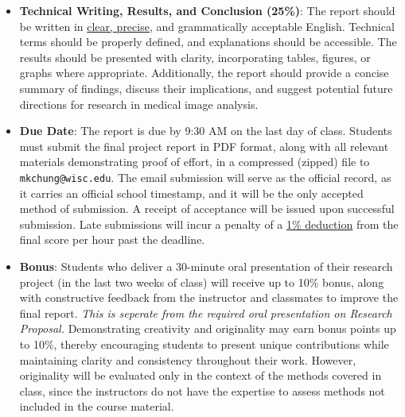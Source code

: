 \documentclass[12pt,portrait]{article}
\begin{document}
\begin{itemize}
{\it Example.} If you are implementing a diffusion-based learning method that was not covered in class, you must connect it to the diffusion equation discussed in class and clearly establish the detailed relationship between your approach and the covered diffusion equations. Failure to make this connection explicit will result in a loss of credit.




\item \textbf{Technical Writing, Results, and Conclusion (25\%)}: The report should be written in \underline{clear, precise}, and grammatically acceptable English. Technical terms should be properly defined, and explanations should be accessible. The results should be presented with clarity, incorporating tables, figures, or graphs where appropriate. Additionally, the report should provide a concise summary of findings, discuss their implications, and suggest potential future directions for research in medical image analysis.
    


\item \textbf{Due Date}: The report is due by 9:30 AM on the last day of class. Students must submit the final project report in PDF format, along with all relevant materials demonstrating proof of effort, in a compressed (zipped) file to {\tt mkchung@wisc.edu}. The email submission will serve as the official record, as it carries an official school timestamp, and it will be the only accepted method of submission. A receipt of acceptance will be issued upon successful submission. Late submissions will incur a penalty of a \underline{1\% deduction} from the final score per hour past the deadline.

\item \textbf{Bonus}: Students who deliver a 30-minute oral presentation of their research project (in the last two weeks of class) will receive up to 10\% bonus, along with constructive feedback from the instructor and classmates to improve the final report. {\it This is seperate from the required oral presentation on Research Proposal.} Demonstrating creativity and originality may earn bonus points up to 10\%, thereby encouraging students to present unique contributions while maintaining clarity and consistency throughout their work. However, originality will be evaluated only in the context of the methods covered in class, since the instructors do not have the expertise to assess methods not included in the course material.




\end{itemize}
\end{document}
